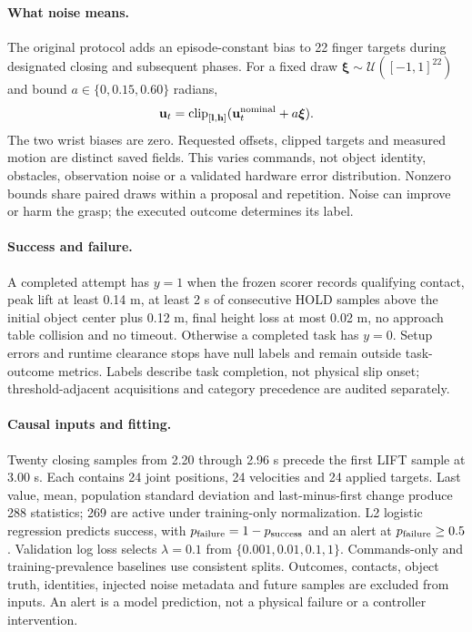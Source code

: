 \documentclass[10pt,letterpaper]{article}
\begin{document}
\paragraph{What noise means.}
The original  protocol adds an episode-constant
bias to 22 finger targets during designated closing and subsequent phases.
For a fixed draw $\boldsymbol\xi\sim\mathcal U([-1,1]^{22})$ and bound
$a\in\{0,0.15,0.60\}$ radians,
\[
 \mathbf u_t=\operatorname{clip}_{[\mathbf l,\mathbf h]}
 (\mathbf u_t^{\rm nominal}+a\boldsymbol\xi).
\]
The two wrist biases are zero. Requested offsets, clipped targets and measured
motion are distinct saved fields. This varies commands, not object identity,
obstacles, observation noise or a validated hardware error distribution.
Nonzero bounds share paired draws within a proposal and repetition. Noise can
improve or harm the grasp; the executed outcome determines its label.

\paragraph{Success and failure.}
A completed attempt has $y=1$ when the frozen scorer records qualifying contact,
peak lift at least 0.14 m, at least 2 s of consecutive HOLD samples above the
initial object center plus 0.12 m, final height loss at most 0.02 m, no approach
table collision and no timeout. Otherwise a completed task has $y=0$.
Setup errors and runtime clearance stops have null labels and remain outside
task-outcome metrics. Labels describe task completion, not physical slip onset;
threshold-adjacent acquisitions and category precedence are audited separately.

\paragraph{Causal inputs and fitting.}
Twenty closing samples from 2.20 through 2.96 s precede the first LIFT sample
at 3.00 s. Each contains 24 joint positions, 24 velocities and 24 applied targets.
Last value, mean, population standard deviation and last-minus-first change
produce 288 statistics; 269 are active under training-only normalization.
L2 logistic regression predicts success, with
$p_{\rm failure}=1-p_{\rm success}$ and an alert at $p_{\rm failure}\geq0.5$.
Validation log loss selects $\lambda=0.1$ from
$\{0.001,0.01,0.1,1\}$. Commands-only and training-prevalence baselines use
consistent splits. Outcomes, contacts, object truth, identities, injected noise
metadata and future samples are excluded from inputs. An alert is a model
prediction, not a physical failure or a controller intervention.
\end{document}

